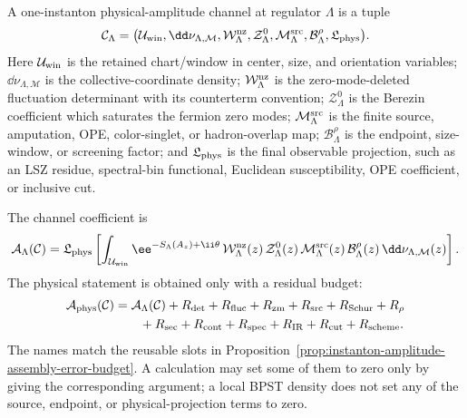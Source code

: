 \begin{definition}
\label{def:instanton-physical-amplitude-channel}
A one-instanton physical-amplitude channel at regulator \(\Lambda\) is a
tuple
\begin{equation}
  \mathcal C_{\Lambda}
  =
  \bigl(
  \mathcal U_{\rm win},
  \dd\nu_{\Lambda,\mathcal M},
  \mathcal W_{\Lambda}^{\rm nz},
  \mathcal Z_{\Lambda}^{0},
  \mathcal M_{\Lambda}^{\rm src},
  \mathcal B_{\Lambda}^{\rho},
  \mathfrak L_{\rm phys}
  \bigr).
  \label{eq:instanton-physical-amplitude-channel}
\end{equation}
Here \(\mathcal U_{\rm win}\) is the retained chart/window in center, size,
and orientation variables; \(\dd\nu_{\Lambda,\mathcal M}\) is the
collective-coordinate density; \(\mathcal W_{\Lambda}^{\rm nz}\) is the
zero-mode-deleted fluctuation determinant with its counterterm convention;
\(\mathcal Z_{\Lambda}^{0}\) is the Berezin coefficient which saturates the
fermion zero modes; \(\mathcal M_{\Lambda}^{\rm src}\) is the finite source,
amputation, OPE, color-singlet, or hadron-overlap map;
\(\mathcal B_{\Lambda}^{\rho}\) is the endpoint, size-window, or screening
factor; and \(\mathfrak L_{\rm phys}\) is the final observable projection,
such as an LSZ residue, spectral-bin functional, Euclidean susceptibility,
OPE coefficient, or inclusive cut.
\end{definition}

The channel coefficient is
\begin{equation}
  \mathcal A_{\Lambda}(\mathcal C)
  =
  \mathfrak L_{\rm phys}
  \left[
  \int_{\mathcal U_{\rm win}}
  \ee^{-S_{\Lambda}(A_z)+\ii\theta}\,
  \mathcal W_{\Lambda}^{\rm nz}(z)\,
  \mathcal Z_{\Lambda}^{0}(z)\,
  \mathcal M_{\Lambda}^{\rm src}(z)\,
  \mathcal B_{\Lambda}^{\rho}(z)\,
  \dd\nu_{\Lambda,\mathcal M}(z)
  \right].
  \label{eq:instanton-physical-channel-functional}
\end{equation}
The physical statement is obtained only with a residual budget:
\begin{equation}
\begin{aligned}
  \mathcal A_{\rm phys}(\mathcal C)
  &=
  \mathcal A_{\Lambda}(\mathcal C)
  +R_{\rm det}+R_{\rm fluc}+R_{\rm zm}+R_{\rm src}+R_{\rm Schur}
   +R_{\rho}                                      \\
  &\qquad
  +R_{\rm sec}+R_{\rm cont}+R_{\rm spec}
   +R_{\rm IR}+R_{\rm cut}+R_{\rm scheme}.
\end{aligned}
  \label{eq:instanton-physical-channel-residual-budget}
\end{equation}
The names match the reusable slots in
Proposition~\ref{prop:instanton-amplitude-assembly-error-budget}.  A
calculation may set some of them to zero only by giving the corresponding
argument; a local BPST density does not set any of the source, endpoint, or
physical-projection terms to zero.

